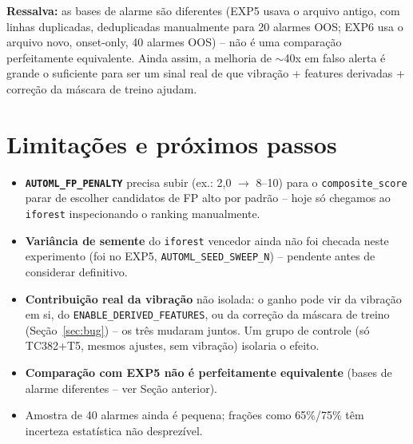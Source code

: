 \documentclass[11pt,a4paper]{article}
\begin{document}
\textbf{Ressalva:} as bases de alarme são diferentes (EXP5 usava o arquivo
antigo, com linhas duplicadas, deduplicadas manualmente para 20 alarmes
OOS; EXP6 usa o arquivo novo, onset-only, 40 alarmes OOS) -- não é uma
comparação perfeitamente equivalente. Ainda assim, a melhoria de $\sim$40x
em falso alerta é grande o suficiente para ser um sinal real de que
vibração + features derivadas + correção da máscara de treino ajudam.

\section{Limitações e próximos passos}

\begin{itemize}
  \item \textbf{\texttt{AUTOML\_FP\_PENALTY}} precisa subir (ex.: 2,0
        $\to$ 8--10) para o \texttt{composite\_score} parar de escolher
        candidatos de FP alto por padrão -- hoje só chegamos ao
        \texttt{iforest} inspecionando o ranking manualmente.
  \item \textbf{Variância de semente} do \texttt{iforest} vencedor ainda
        não foi checada neste experimento (foi no EXP5,
        \texttt{AUTOML\_SEED\_SWEEP\_N}) -- pendente antes de considerar
        definitivo.
  \item \textbf{Contribuição real da vibração} não isolada: o ganho pode
        vir da vibração em si, do \texttt{ENABLE\_DERIVED\_FEATURES}, ou da
        correção da máscara de treino (Seção~\ref{sec:bug}) -- os três
        mudaram juntos. Um grupo de controle (só TC382+T5, mesmos ajustes,
        sem vibração) isolaria o efeito.
  \item \textbf{Comparação com EXP5 não é perfeitamente equivalente}
        (bases de alarme diferentes -- ver Seção anterior).
  \item Amostra de 40 alarmes ainda é pequena; frações como 65\%/75\% têm
        incerteza estatística não desprezível.
\end{itemize}
\end{document}
